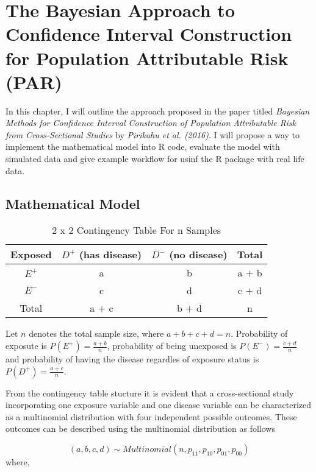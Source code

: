 \chapter{The Bayesian Approach to Confidence Interval Construction for Population Attributable Risk (PAR)} \label{sec:bayesian-model}

In this chapter, I will outline the approach proposed in the paper titled \textit{Bayesian Methods for Confidence Interval Construction of Population Attributable Risk from Cross-Sectional Studies} by \textit{Pirikahu et al. (2016)}. I will propose a way to implement the mathematical model into R code, evaluate the model with simulated data and give example workflow for usinf the R package with real life data.

\section{Mathematical Model} \label{PiriMath}
\begin{table}[ht]
\centering
\caption{2 x 2 Contingency Table For n Samples}
\label{contingency-table}
\begin{tabular}{|c|c|c|c|}
\hline
Exposed & $D^+$ (has disease) & $D^-$ (no disease) & Total \\ \hline
$E^+$ & a & b & a $+$ b \\ \hline
$E^-$ & c & d & c $+$ d \\ \hline
Total & a $+$ c & b $+$ d & n \\ \hline
\end{tabular}
\end{table}

Let $n$ denotes the total sample size, where $a + b + c + d = n$. Probability of exposute is $P(E^+) = \frac{a + b}{n}$, probability of being unexposed is $P(E^-) = \frac{c + d}{n}$ and probability of having the disease regardles of exposure status is $P(D^+) = \frac{a + c}{n}$.

From the contingency table stucture it is evident that a cross-sectional study incorporating one exposure variable and one disease variable can be characterized as a multinomial distribution with four independent possible outcomes. These outcomes can be described using the multinomial distribution as follows

\begin{equation} \label{multinomial}
(a, b, c, d) \sim Multinomial(n, p_{11}, p_{10}, p_{01}, p_{00})
\end{equation} where,

